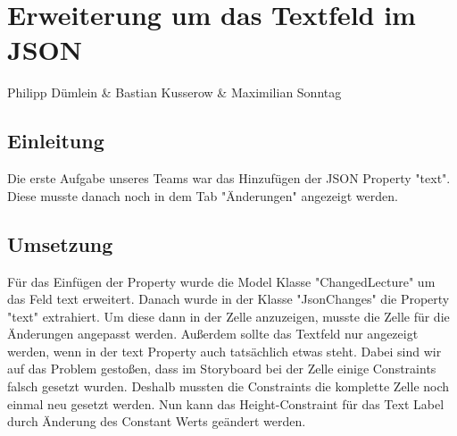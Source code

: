 \chapter{Erweiterung um das Textfeld im JSON}
Philipp Dümlein \& Bastian Kusserow \& Maximilian Sonntag

\section{Einleitung}
Die erste Aufgabe unseres Teams war das Hinzufügen der JSON Property "text". Diese musste danach noch in dem Tab "Änderungen" angezeigt werden.

\section{Umsetzung}
Für das Einfügen der Property wurde die Model Klasse "ChangedLecture" um das Feld text erweitert. Danach wurde in der Klasse "JsonChanges" die Property "text" extrahiert.
Um diese dann in der Zelle anzuzeigen, musste die Zelle für die Änderungen angepasst werden. Außerdem sollte das Textfeld nur angezeigt werden, wenn in der text Property auch tatsächlich etwas steht. Dabei sind wir auf das Problem gestoßen, dass im Storyboard bei der Zelle einige Constraints falsch gesetzt wurden. Deshalb mussten die Constraints die komplette Zelle noch einmal neu gesetzt werden. Nun kann das Height-Constraint für das Text Label durch Änderung des Constant Werts geändert werden.

